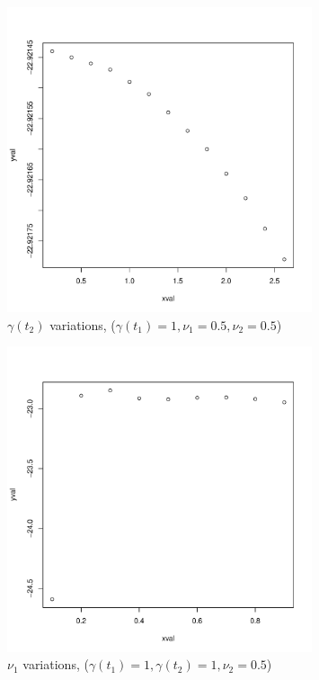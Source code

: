\documentclass[a4paper,11pt]{article}
\begin{document}
\begin{figure}[H]
\centering
\includegraphics[width=0.8\textwidth]{test1_gamma2.pdf}
\caption{$\gamma(t_2)$ variations, ($\gamma(t_1) = 1, \nu_1 = 0.5, \nu_2 = 0.5$)}
\end{figure}

\begin{figure}[H]
\centering
\includegraphics[width=0.8\textwidth]{test1_nu1.pdf}
\caption{$\nu_1$ variations, ($\gamma(t_1) = 1, \gamma(t_2) = 1, \nu_2 = 0.5$)}
\end{figure}
\end{document}
